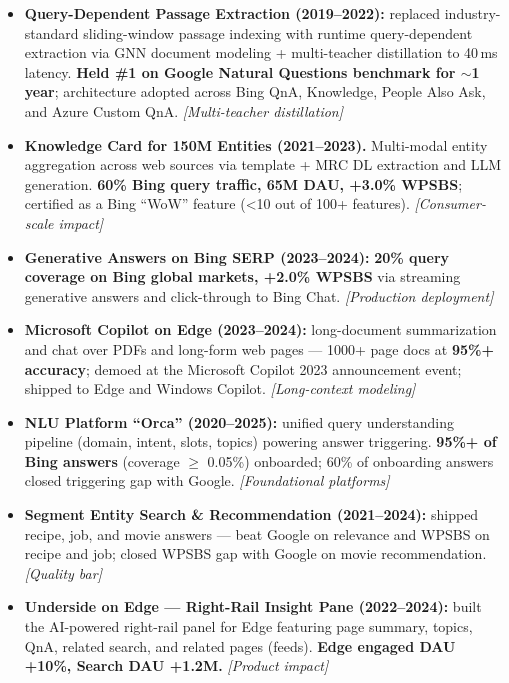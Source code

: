 \documentclass[10.5pt,letterpaper]{article}
\newcommand{\lp}[1]{\textcolor{blue!55!black}{\small\textit{[#1]}}}
\begin{document}
\begin{itemize}
  \item \textbf{Query-Dependent Passage Extraction (2019--2022):} replaced industry-standard sliding-window passage indexing with runtime query-dependent extraction via GNN document modeling + multi-teacher distillation to 40\,ms latency. \textbf{Held \#1 on Google Natural Questions benchmark for $\sim$1 year}; architecture adopted across Bing QnA, Knowledge, People Also Ask, and Azure Custom QnA. \lp{Multi-teacher distillation}
  \item \textbf{Knowledge Card for 150M Entities (2021--2023).} Multi-modal entity aggregation across web sources via template + MRC DL extraction and LLM generation. \textbf{60\% Bing query traffic, 65M DAU, +3.0\% WPSBS}; certified as a Bing ``WoW'' feature (<10 out of 100+ features). \lp{Consumer-scale impact}
  \item \textbf{Generative Answers on Bing SERP (2023--2024):} \textbf{20\% query coverage on Bing global markets, +2.0\% WPSBS} via streaming generative answers and click-through to Bing Chat. \lp{Production deployment}
  \item \textbf{Microsoft Copilot on Edge (2023--2024):} long-document summarization and chat over PDFs and long-form web pages --- 1000+ page docs at \textbf{95\%+ accuracy}; demoed at the Microsoft Copilot 2023 announcement event; shipped to Edge and Windows Copilot. \lp{Long-context modeling}
  \item \textbf{NLU Platform ``Orca'' (2020--2025):} unified query understanding pipeline (domain, intent, slots, topics) powering answer triggering. \textbf{95\%+ of Bing answers} (coverage $\ge$ 0.05\%) onboarded; 60\% of onboarding answers closed triggering gap with Google. \lp{Foundational platforms}
  \item \textbf{Segment Entity Search \& Recommendation (2021--2024):} shipped recipe, job, and movie answers --- beat Google on relevance and WPSBS on recipe and job; closed WPSBS gap with Google on movie recommendation. \lp{Quality bar}
  \item \textbf{Underside on Edge --- Right-Rail Insight Pane (2022--2024):} built the AI-powered right-rail panel for Edge featuring page summary, topics, QnA, related search, and related pages (feeds). \textbf{Edge engaged DAU +10\%, Search DAU +1.2M.} \lp{Product impact}
\end{itemize}

\end{document}
